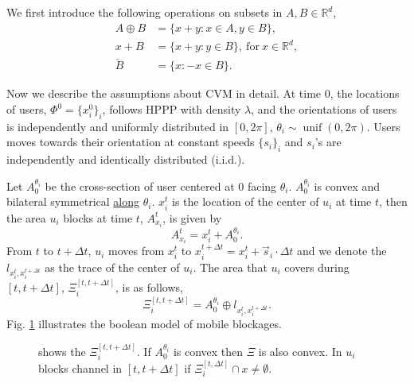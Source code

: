 \documentclass[10pt, conference, letterpaper]{IEEEtran}
\DeclareMathOperator*{\unif}{unif}
\begin{document}
We first introduce the following operations on subsets in $A, B\in \mathbb{R}^d$, 
\begin{equation*}
\begin{split}
A \oplus B & = \{x+y:x\in A, y\in B\},\\
x + B & = \{x+y:y\in B\}, \mathrm{~for~} x\in \mathbb{R}^d, \\
\check{B} & = \{x: -x \in B\}.
\end{split}
\end{equation*}

Now we describe the assumptions about CVM in detail. At time $0$, the locations of users, $\Phi^0 = \{x_i^0\}_i$, follows HPPP with density $\lambda$, and the orientations of users is independently and uniformly distributed in $[0, 2\pi]$, $\theta_i \sim \unif(0, 2\pi)$. Users moves towards their orientation at constant speeds $\{s_i\}_i$ and $s_i$'s are independently and identically distributed (i.i.d.).

Let $A_0^{\theta_i}$ be the cross-section of user centered at $0$ facing $\theta_i$. $A_0^{\theta_i}$ is convex and bilateral symmetrical \underline{along} $\theta_i$.
$x_i^t$ is the location of the center of $u_i$ at time $t$, then the area $u_i$ blocks at time $t$, $A_{x_i}^t$, is given by 
\begin{equation*}
A_{x_i}^t = x_i^t + A_0^{\theta_i}.
\end{equation*}
From $t$ to $t+\Delta t$, $u_i$ moves from $x_i^t$ to $x_i^{t+\Delta t} = x_i^t + \vec{s}_i\cdot \Delta t$ and we denote the $l_{x_i^t, x_i ^{t+\Delta t}}$ as the trace of the center of $u_i$. The area that $u_i$ covers during $[t, t+\Delta t]$, $\Xi_i^{[t, t+\Delta t]}$, is as follows, 
\begin{equation*} %
\Xi_i^{[t, t+\Delta t]}=A_0^{\theta_i} \oplus l_{x_i^t, x_i ^{t+\Delta t} }.
\end{equation*}
Fig. \ref{fig:boolean} illustrates the boolean model of mobile blockages.

\begin{figure}
	\centering
	\mbox{}
	\mbox{}
	\caption[]{ shows the $\Xi_i^{[t, t+\Delta t]}$. If $A_0^{\theta_i}$ is convex then $\Xi$ is also convex. In  $u_i$ blocks channel in $[t, t+ \Delta t]$ if $\Xi_i^{[t, \Delta t]}\cap x \neq \emptyset$. }
	\label{fig:boolean}
\end{figure}
\end{document}
